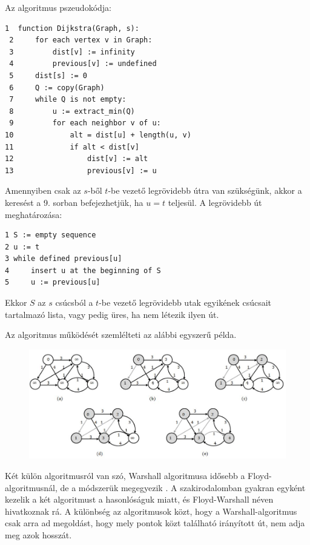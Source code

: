 Az algoritmus pszeudokódja:

\begin{verbatim}
1  function Dijkstra(Graph, s):
 2     for each vertex v in Graph:     
 3         dist[v] := infinity         
 4         previous[v] := undefined
 5     dist[s] := 0                    
 6     Q := copy(Graph)                
 7     while Q is not empty:
 8         u := extract_min(Q)        
 9         for each neighbor v of u:
10             alt = dist[u] + length(u, v)
11             if alt < dist[v]       
12                 dist[v] := alt      
13                 previous[v] := u
\end{verbatim}

Amennyiben csak az $s$-ből $t$-be vezető legrövidebb útra van szükségünk, akkor a keresést a 9. sorban befejezhetjük, ha $u = t$ teljesül. A legrövidebb út meghatározása:

\begin{verbatim}
1 S := empty sequence
2 u := t
3 while defined previous[u]
4     insert u at the beginning of S
5     u := previous[u]
\end{verbatim}

Ekkor $S$ az $s$ csúcsból a $t$-be vezető legrövidebb utak egyikének csúcsait tartalmazó lista, vagy pedig üres, ha nem létezik ilyen út.

Az algoritmus működését szemlélteti az alábbi egyszerű példa.

\begin{figure}[htb]
\centering
\includegraphics[scale=0.5]{kepek/dijkstra.jpg}
\caption{}
\label{fig:dijkstra}
\end{figure}


Két külön algoritmusról van szó, Warshall algoritmusa idősebb a Floyd-algoritmusnál, de a módszerük megegyezik \cite{floyd-warshall}. A szakirodalomban gyakran egyként kezelik a két algoritmust a hasonlóságuk miatt, és Floyd-Warshall néven hivatkoznak rá.
A különbség az algoritmusok közt, hogy a Warshall-algoritmus csak arra ad megoldást, hogy mely pontok közt található irányított út, nem adja meg azok hosszát.

